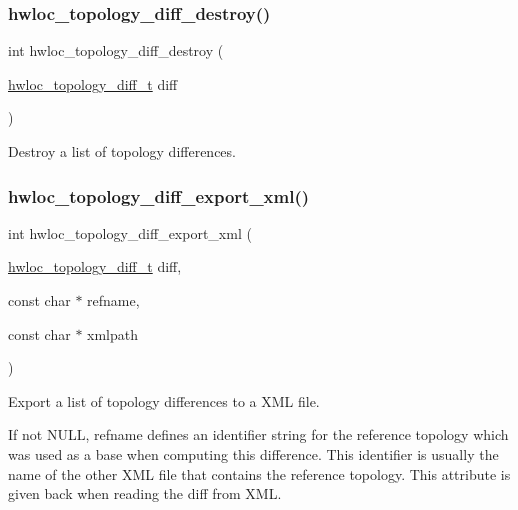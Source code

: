 \subsubsection{\texorpdfstring{hwloc\+\_\+topology\+\_\+diff\+\_\+destroy()}{hwloc\_topology\_diff\_destroy()}}
{\footnotesize\ttfamily int hwloc\+\_\+topology\+\_\+diff\+\_\+destroy (\begin{DoxyParamCaption}\item[{\hyperlink{a00225_ga2cf1b17332fe5d95f2198f6340cfd288}{hwloc\+\_\+topology\+\_\+diff\+\_\+t}}]{diff }\end{DoxyParamCaption})}



Destroy a list of topology differences. 

\mbox{\label{a00225_ga8a14dd7d01efbdd97af7fe85e8b84b20}} 
\subsubsection{\texorpdfstring{hwloc\+\_\+topology\+\_\+diff\+\_\+export\+\_\+xml()}{hwloc\_topology\_diff\_export\_xml()}}
{\footnotesize\ttfamily int hwloc\+\_\+topology\+\_\+diff\+\_\+export\+\_\+xml (\begin{DoxyParamCaption}\item[{\hyperlink{a00225_ga2cf1b17332fe5d95f2198f6340cfd288}{hwloc\+\_\+topology\+\_\+diff\+\_\+t}}]{diff,  }\item[{const char $\ast$}]{refname,  }\item[{const char $\ast$}]{xmlpath }\end{DoxyParamCaption})}



Export a list of topology differences to a X\+ML file. 

If not {\ttfamily N\+U\+LL}, {\ttfamily refname} defines an identifier string for the reference topology which was used as a base when computing this difference. This identifier is usually the name of the other X\+ML file that contains the reference topology. This attribute is given back when reading the diff from X\+ML. \mbox{\label{a00225_gaa2f0918df60c1c4a0bef9411f7d92a13}} 
